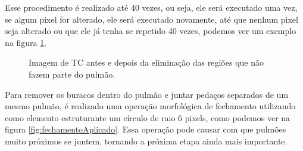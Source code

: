 Esse procedimento é realizado até 40 vezes, ou seja, ele será executado uma vez, se algum pixel for alterado, ele será executado novamente, até que nenhum pixel seja alterado ou que ele já tenha se repetido 40 vezes, podemos ver um exemplo na figura \ref{fig:clean}.

\begin{figure}[ht]
 \begin{center}
 \end{center}
 \caption{Imagem de TC antes e depois da eliminação das regiões que não fazem parte do pulmão.}
 \label{fig:clean}
\end{figure}

Para remover os buracos dentro do pulmão e juntar pedaços separados de um mesmo pulmão, é realizado uma operação morfológica de fechamento utilizando como elemento estruturante um círculo de raio 6 pixels, como podemos ver na figura \ref{fig:fechamentoAplicado}. Essa operação pode causar com que pulmões muito próximos se juntem, tornando a próxima etapa ainda mais importante.

